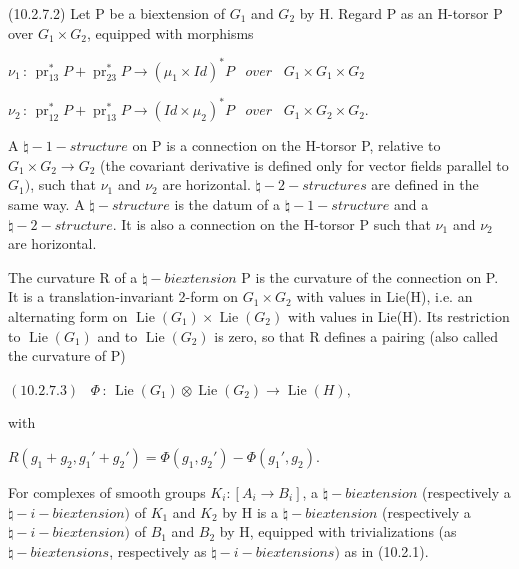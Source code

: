 \documentclass[11pt,twoside]{article}
\newcommand{\DFormula}[1]{%
  \par\smallskip\noindent\hspace*{0pt}\(\displaystyle #1\)\par\smallskip
}
\begin{document}
(10.2.7.2) Let P be a biextension of \(G_{1}\) and \(G_{2}\) by H. Regard P as an H-torsor P over \(G_{1}\times G_{2}\), equipped with morphisms\par
\par\medskip
\DFormula{\nu _{1}\,:\,\operatorname{pr}_{13}^{\ast }P+\operatorname{pr}_{23}^{\ast }P\to (\mu _{1}\times Id)^{\ast }P\,\,\,\,\,over\,\,\,\,\,G_{1}\times G_{1}\times G_{2}}
\DFormula{\nu _{2}\,:\,\operatorname{pr}_{12}^{\ast }P+\operatorname{pr}_{13}^{\ast }P\to (Id\times \mu _{2})^{\ast }P\,\,\,\,\,over\,\,\,\,\,G_{1}\times G_{2}\times G_{2}.}
\par\medskip
A \(\natural -1-structure\) on P is a connection on the H-torsor P, relative to \(G_{1}\times G_{2}\to G_{2}\) (the covariant derivative is defined only for vector fields parallel to \(G_{1})\), such that \(\nu _{1}\) and \(\nu _{2}\) are horizontal. \(\natural -2-structures\) are defined in the same way. A \(\natural -structure\) is the datum of a \(\natural -1-structure\) and a \(\natural -2-structure\). It is also a connection on the H-torsor P such that \(\nu _{1}\) and \(\nu _{2}\) are horizontal.\par
\par\medskip
The curvature R of a \(\natural -biextension\) P is the curvature of the connection on P. It is a translation-invariant 2-form on \(G_{1}\times G_{2}\) with values in Lie(H), i.e. an alternating form on \(\operatorname{Lie}(G_{1})\times \operatorname{Lie}(G_{2})\) with values in Lie(H). Its restriction to \(\operatorname{Lie}(G_{1})\) and to \(\operatorname{Lie}(G_{2})\) is zero, so that R defines a pairing (also called the curvature of P)\par
\par\medskip
\DFormula{(10.2.7.3)\,\,\,\,\,\Phi \,:\,\operatorname{Lie}(G_{1})\otimes \operatorname{Lie}(G_{2})\to \operatorname{Lie}(H),}
\par\medskip
with\par
\par\medskip
\DFormula{R(g_{1}+g_{2},g_{1}′+g_{2}′)=\Phi (g_{1},g_{2}′)−\Phi (g_{1}′,g_{2}).}
\par\medskip
For complexes of smooth groups \(K_{i}:[A_{i}\to B_{i}]\), a \(\natural -biextension\) (respectively a \(\natural -i-biextension)\) of \(K_{1}\) and \(K_{2}\) by H is a \(\natural -biextension\) (respectively a \(\natural -i-biextension)\) of \(B_{1}\) and \(B_{2}\) by H, equipped with trivializations (as \(\natural -biextensions\), respectively as \(\natural -i-biextensions)\) as in (10.2.1).\par
\end{document}
